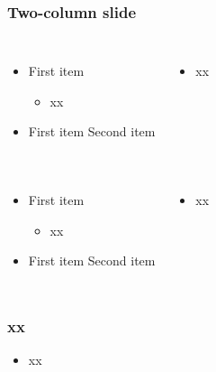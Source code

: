 \documentclass[UTF8]{ctexbeamer}
\begin{document}
\begin{frame}
    \frametitle{Two-column slide}
    \begin{columns}
    \begin{itemize}
    \item First item
        \begin{itemize}
            \item xx
        \end{itemize}
    
    \item First item
    \subitem Second item
    \end{itemize}
     
        \begin{itemize}
            \item xx
        \end{itemize}
    \end{columns}
     
    \begin{columns}
     
    \begin{itemize}
    \item First item
        \begin{itemize}
            \item xx
        \end{itemize}
    
    \item First item
    \subitem Second item
    \end{itemize}
     
        \begin{itemize}
            \item xx
        \end{itemize}
    \end{columns}
    \end{frame}
    
    
    
    \begin{frame}
        \frametitle{xx}
        \begin{itemize}
            \item xx
        \end{itemize}
    \end{frame}

\end{document}
